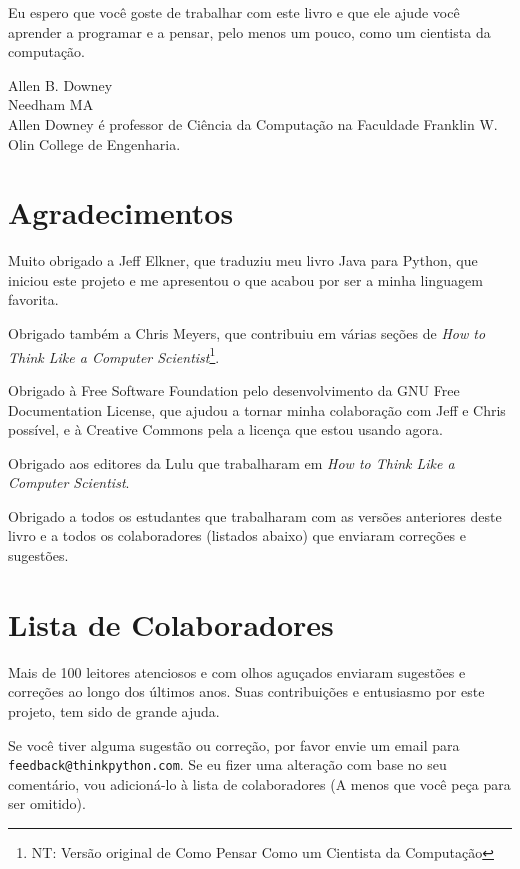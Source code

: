\documentclass[10pt]{book}
\begin{document}
Eu espero que você goste de trabalhar com este livro e que ele ajude
você aprender a programar e a pensar, pelo menos um pouco, como
um cientista da computação.


Allen B. Downey \\
Needham MA\\

Allen Downey é professor de Ciência da Computação na
Faculdade Franklin W. Olin College de Engenharia.


\section*{Agradecimentos}

Muito obrigado a Jeff Elkner, que
traduziu meu livro Java para Python, que iniciou este
projeto e me apresentou o que acabou por ser a minha
linguagem favorita.

Obrigado também a Chris Meyers, que contribuiu em várias seções
de {\em How to Think Like a Computer Scientist}\footnote{NT: Versão original de Como Pensar Como um Cientista da Computação}.

Obrigado à Free Software Foundation pelo desenvolvimento
da GNU Free Documentation License, que ajudou a tornar
minha colaboração com Jeff e Chris possível, e à Creative
Commons pela a licença que estou usando agora.

Obrigado aos editores da Lulu que trabalharam em
{\em How to Think Like a Computer Scientist}.

Obrigado a todos os estudantes que trabalharam com as versões
anteriores deste livro e a todos os colaboradores (listados
abaixo) que enviaram correções e sugestões.


\section*{Lista de Colaboradores}

Mais de 100 leitores atenciosos e com olhos aguçados enviaram
sugestões e correções ao longo dos últimos anos. Suas
contribuições e entusiasmo por este projeto, tem sido de
grande ajuda.

Se você tiver alguma sugestão ou correção, por favor envie um email para 
{\tt feedback@thinkpython.com}. Se eu fizer uma alteração com base no seu
comentário, vou adicioná-lo à lista de colaboradores
(A menos que você peça para ser omitido).
\end{document}

